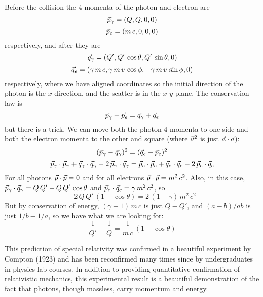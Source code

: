 Before the collision the 4-momenta of the photon and electron are
\begin{equation}
\vec{p}_{\gamma} = (Q,Q,0,0)\nonumber\\
\end{equation}
\begin{equation}
\vec{p}_e = (m\,c,0,0,0)
\end{equation}
respectively, and after they are
\begin{equation}
\vec{q}_{\gamma} = (Q',Q'\,\cos\theta,Q'\,\sin\theta,0)
\end{equation}
\begin{equation}
\vec{q}_e = (\gamma\,m\,c,\gamma\,m\,v\,\cos\phi,-\gamma\,m\,v\,\sin\phi,0)
\end{equation}
respectively, where we have aligned coordinates so the initial
direction of the photon is the $x$-direction, and the scatter is in
the $x$-$y$ plane.  The conservation law is
\begin{equation}
\vec{p}_{\gamma}+\vec{p}_e=\vec{q}_{\gamma}+\vec{q}_e
\end{equation}
but there is a trick.  We can move both the photon 4-momenta to one
side and both the electron momenta to the other and square (where
$\vec{a}^2$ is just $\vec{a}\cdot\vec{a}$):
\begin{equation}
(\vec{p}_{\gamma}-\vec{q}_{\gamma})^2 = (\vec{q}_e-\vec{p}_e)^2
\end{equation}
\begin{equation}
\vec{p}_{\gamma}\cdot\vec{p}_{\gamma}
+ \vec{q}_{\gamma}\cdot\vec{q}_{\gamma}
- 2\,\vec{p}_{\gamma}\cdot\vec{q}_{\gamma}
= \vec{p}_e\cdot\vec{p}_e + \vec{q}_e\cdot\vec{q}_e
- 2\,\vec{p}_e\cdot\vec{q}_e
\end{equation}
For all photons $\vec{p}\cdot\vec{p}=0$ and for all electrons
$\vec{p}\cdot\vec{p}=m^2\,c^2$.  Also, in this case,
$\vec{p}_{\gamma}\cdot\vec{q}_{\gamma}=Q\,Q'-Q\,Q'\,\cos\theta$ and
$\vec{p}_e\cdot\vec{q}_e=\gamma\,m^2\,c^2$, so
\begin{equation}
- 2\,Q\,Q'\,(1-\cos\theta) = 2\,(1-\gamma)\,m^2\,c^2
\end{equation}
But by conservation of energy, $(\gamma-1)\,m\,c$ is just $Q-Q'$, and
$(a-b)/ab$ is just $1/b-1/a$, so we have what we are looking for:
\begin{equation}
\frac{1}{Q'}-\frac{1}{Q} = \frac{1}{m\,c}\,(1-\cos\theta)
\end{equation}

This prediction of special relativity was confirmed in a beautiful
experiment by Compton (1923) and has been reconfirmed many times
since by undergraduates in physics lab courses.  In addition to
providing quantitative confirmation of relativistic mechanics, this
experimental result is a beautiful demonstration of the fact that
photons, though massless, carry momentum and energy.


